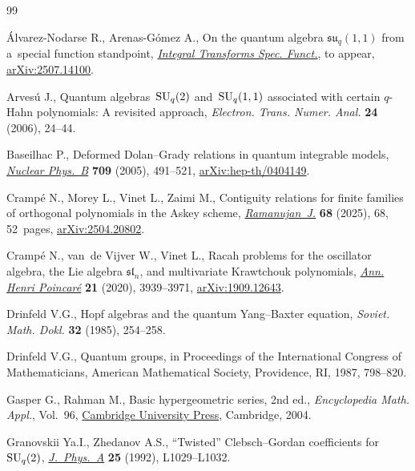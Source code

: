 \documentclass[pdftex]{sigma}
\numberwithin{equation}{section}
\theoremstyle{definition}
\begin{document}
\begin{thebibliography}{99}
\footnotesize\itemsep=0pt

{\'A}lvarez-Nodarse R., Arenas-G\'omez A., On the quantum algebra
 $\mathfrak{su}_q(1,1)$ from a~special function standpoint,
 \href{https://doi.org/10.1080/10652469.2025.2579756}{\textit{Integral
 Transforms Spec. Funct.}}, {t}o appear,
 \href{http://arxiv.org/abs/2507.14100}{arXiv:2507.14100}.

Arves\'u J., Quantum algebras~{${\rm SU}_q(2)$} and~{${\rm SU}_q(1,1)$}
 associated with certain {$q$}-{H}ahn polynomials: {A} revisited approach,
 \textit{Electron. Trans. Numer. Anal.} \textbf{24} (2006), 24--44.

Baseilhac P., Deformed {D}olan--{G}rady relations in quantum integrable models,
 \href{https://doi.org/10.1016/j.nuclphysb.2004.12.016}{\textit{Nuclear
 Phys.~B}} \textbf{709} (2005), 491--521,
 \href{http://arxiv.org/abs/hep-th/0404149}{arXiv:hep-th/0404149}.

Cramp\'e N., Morey L., Vinet L., Zaimi M., Contiguity relations for finite
 families of orthogonal polynomials in the {A}skey scheme,
 \href{https://doi.org/10.1007/s11139-025-01229-w}{\textit{Ramanujan~J.}}
 \textbf{68} (2025), 68, 52~pages,
 \href{http://arxiv.org/abs/2504.20802}{arXiv:2504.20802}.

Cramp\'e N., van~de Vijver W., Vinet L., Racah problems for the oscillator
 algebra, the {L}ie algebra {$\mathfrak{sl}_n$}, and multivariate {K}rawtchouk
 polynomials, \href{https://doi.org/10.1007/s00023-020-00972-8}{\textit{Ann.
 Henri Poincar\'e}} \textbf{21} (2020), 3939--3971,
 \href{http://arxiv.org/abs/1909.12643}{arXiv:1909.12643}.

Drinfeld V.G., Hopf algebras and the quantum {Y}ang--{B}axter equation,
 \textit{Soviet. Math. Dokl.} \textbf{32} (1985), 254--258.

Drinfeld V.G., Quantum groups, in Proceedings of the {I}nternational {C}ongress
 of {M}athematicians, American Mathematical Society, Providence, RI, 1987,
 798--820.

Gasper G., Rahman M., Basic hypergeometric series, 2nd ed., \textit{Encyclopedia Math.
 Appl.}, Vol.~96,
 \href{https://doi.org/10.1017/CBO9780511526251}{Cambridge University Press},
 Cambridge, 2004.

Granovskii Ya.I., Zhedanov A.S., ``{T}wisted'' {C}lebsch--{G}ordan coefficients
 for~{${\rm SU}_q(2)$},
 \href{https://doi.org/10.1088/0305-4470/25/17/002}{\textit{J.~Phys.~A}}
 \textbf{25} (1992), L1029--L1032.


\end{thebibliography}
\end{document}
